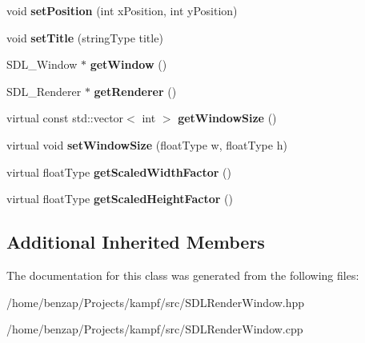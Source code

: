 \begin{DoxyCompactItemize}
\item 
\hypertarget{classSDLRenderWindow_a5b15c6c33c9abdf957d6068060fe097b}{void {\bfseries set\-Position} (int x\-Position, int y\-Position)}\label{classSDLRenderWindow_a5b15c6c33c9abdf957d6068060fe097b}

\item 
\hypertarget{classSDLRenderWindow_abdfefc36c85fd4ac53585cc6f26a8b7c}{void {\bfseries set\-Title} (string\-Type title)}\label{classSDLRenderWindow_abdfefc36c85fd4ac53585cc6f26a8b7c}

\item 
\hypertarget{classSDLRenderWindow_ab5b3baba89ce4a4afdf658fbf1f1f852}{S\-D\-L\-\_\-\-Window $\ast$ {\bfseries get\-Window} ()}\label{classSDLRenderWindow_ab5b3baba89ce4a4afdf658fbf1f1f852}

\item 
\hypertarget{classSDLRenderWindow_a7213fb1c19bf010cfcc600283fa04461}{S\-D\-L\-\_\-\-Renderer $\ast$ {\bfseries get\-Renderer} ()}\label{classSDLRenderWindow_a7213fb1c19bf010cfcc600283fa04461}

\item 
\hypertarget{classSDLRenderWindow_aa18ab3d132fcf7d6ca459fef663de47c}{virtual const std\-::vector$<$ int $>$ {\bfseries get\-Window\-Size} ()}\label{classSDLRenderWindow_aa18ab3d132fcf7d6ca459fef663de47c}

\item 
\hypertarget{classSDLRenderWindow_af8be3ada3c035d0550e0b03f45d6e461}{virtual void {\bfseries set\-Window\-Size} (float\-Type w, float\-Type h)}\label{classSDLRenderWindow_af8be3ada3c035d0550e0b03f45d6e461}

\item 
\hypertarget{classSDLRenderWindow_ac7487667a81b94aff004f8b259e13736}{virtual float\-Type {\bfseries get\-Scaled\-Width\-Factor} ()}\label{classSDLRenderWindow_ac7487667a81b94aff004f8b259e13736}

\item 
\hypertarget{classSDLRenderWindow_ac28a3195ee653756afca0dcb92a83bfb}{virtual float\-Type {\bfseries get\-Scaled\-Height\-Factor} ()}\label{classSDLRenderWindow_ac28a3195ee653756afca0dcb92a83bfb}

\end{DoxyCompactItemize}
\subsection*{Additional Inherited Members}


The documentation for this class was generated from the following files\-:\begin{DoxyCompactItemize}
\item 
/home/benzap/\-Projects/kampf/src/S\-D\-L\-Render\-Window.\-hpp\item 
/home/benzap/\-Projects/kampf/src/S\-D\-L\-Render\-Window.\-cpp\end{DoxyCompactItemize}
